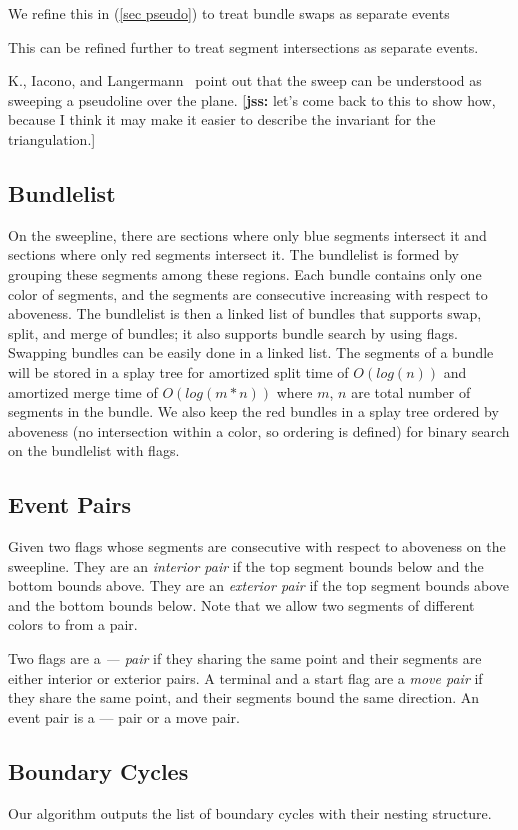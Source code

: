 \documentclass[11pt]{article}
\def\jss#1{{\footnotesize [{\bf jss:} #1]}}
\begin{document}
We refine this in (\ref{sec pseudo}) to treat bundle swaps as separate events

This can be refined further to treat segment intersections as separate events. 

K., Iacono, and Langermann~\cite{}  point out that the sweep can be understood as sweeping a pseudoline over the plane.  \jss{let's come back to this to show how, because I think it may make it easier to describe the invariant for the triangulation.}

\subsection{Bundlelist}
On the sweepline, there are sections where only blue segments intersect it and sections where only red segments intersect it. 
The bundlelist is formed by grouping these segments among these regions.
Each bundle contains only one color of segments, and the segments are consecutive increasing with respect to aboveness.
The bundlelist is then a linked list of bundles that supports swap, split, and merge of bundles; it also supports bundle search by using flags.
Swapping bundles can be easily done in a linked list.
The segments of a bundle will be stored in a splay tree for amortized split time of $O(log(n))$ and amortized merge time of $O(log(m*n))$ where $m$, $n$ are total number of segments in the bundle.
We also keep the red bundles in a splay tree ordered by aboveness (no intersection within a color, so ordering is defined) for binary search on the bundlelist with flags.

\subsection{Event Pairs}
Given two flags whose segments are consecutive with respect to aboveness on the sweepline.
They are an \textit{interior pair} if the top segment bounds below and the bottom bounds above.
They are an \textit{exterior pair} if the top segment bounds above and the bottom bounds below.
Note that we allow two segments of different colors to from a pair.

Two flags are a \textit{--- pair} if they sharing the same point and their segments are either interior or exterior pairs.
A terminal and a start flag are a \textit{move pair} if they share the same point, and their segments bound the same direction.
An event pair is a --- pair or a move pair.

\subsection{Boundary Cycles}
Our algorithm outputs the list of boundary cycles with their nesting structure.
\end{document}
